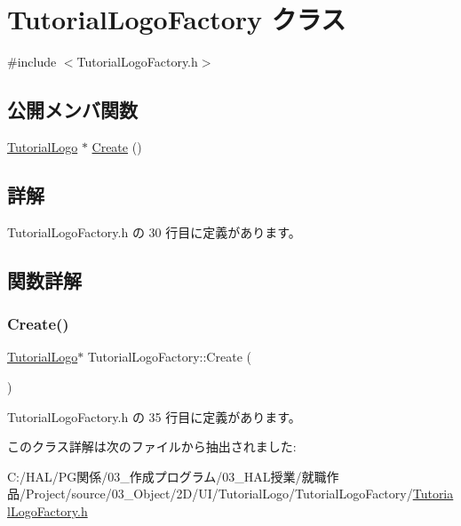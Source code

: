 \hypertarget{class_tutorial_logo_factory}{}\section{Tutorial\+Logo\+Factory クラス}
\label{class_tutorial_logo_factory}


{\ttfamily \#include $<$Tutorial\+Logo\+Factory.\+h$>$}

\subsection*{公開メンバ関数}
\begin{DoxyCompactItemize}
\item 
\mbox{\hyperlink{class_tutorial_logo}{Tutorial\+Logo}} $\ast$ \mbox{\hyperlink{class_tutorial_logo_factory_adc1e80456f8ab75ba30c7a1e9767afd8}{Create}} ()
\end{DoxyCompactItemize}


\subsection{詳解}


 Tutorial\+Logo\+Factory.\+h の 30 行目に定義があります。



\subsection{関数詳解}
\mbox{\label{class_tutorial_logo_factory_adc1e80456f8ab75ba30c7a1e9767afd8}} 
\subsubsection{\texorpdfstring{Create()}{Create()}}
{\footnotesize\ttfamily \mbox{\hyperlink{class_tutorial_logo}{Tutorial\+Logo}}$\ast$ Tutorial\+Logo\+Factory\+::\+Create (\begin{DoxyParamCaption}{ }\end{DoxyParamCaption})\hspace{0.3cm}{\ttfamily [inline]}}



 Tutorial\+Logo\+Factory.\+h の 35 行目に定義があります。



このクラス詳解は次のファイルから抽出されました\+:\begin{DoxyCompactItemize}
\item 
C\+:/\+H\+A\+L/\+P\+G関係/03\+\_\+作成プログラム/03\+\_\+\+H\+A\+L授業/就職作品/\+Project/source/03\+\_\+\+Object/2\+D/\+U\+I/\+Tutorial\+Logo/\+Tutorial\+Logo\+Factory/\mbox{\hyperlink{_tutorial_logo_factory_8h}{Tutorial\+Logo\+Factory.\+h}}\end{DoxyCompactItemize}
